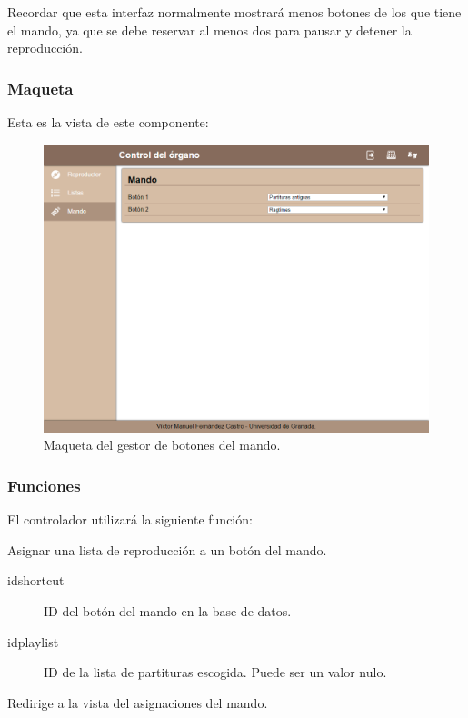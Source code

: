 Recordar que esta interfaz normalmente mostrará menos botones de los que tiene el mando, ya que se debe reservar al menos dos para pausar y detener la reproducción.

\subsubsection{Maqueta}

Esta es la vista de este componente:

\smallskip

\begin{figure}[H]
	\noindent \begin{centering}
		\includegraphics[width=\linewidth*3/4]{capitulo4/cap_mando}
		\par\end{centering}
	\smallskip
	\caption{\label{fig:cap_mando} Maqueta del gestor de botones del mando.}
\end{figure} 

\smallskip

\subsubsection{Funciones}

El controlador utilizará la siguiente función:

\begin{description}[style=nextline]
	\item[set\_shortcut (idshortcut, idplaylist)]
	Asignar una lista de reproducción a un botón del mando.
	
	\begin{description}
		\item[idshortcut] ID del botón del mando en la base de datos.
		\item[idplaylist] ID de la lista de partituras escogida. Puede ser un valor nulo.
	\end{description}
	
	Redirige a la vista del asignaciones del mando.
\end{description}

